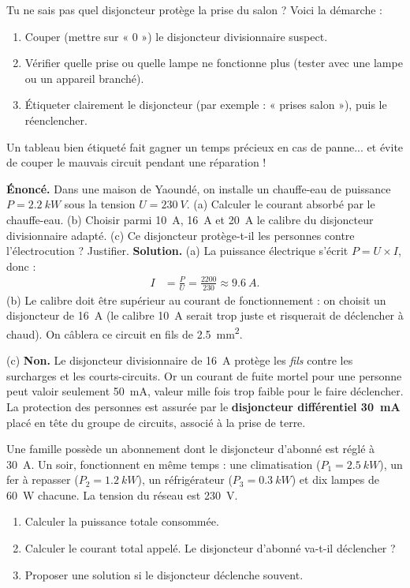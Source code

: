 \documentclass[11pt]{article}
\begin{document}
\begin{methode}
Tu ne sais pas quel disjoncteur protège la prise du salon ? Voici la démarche :
\begin{enumerate}
\item Couper (mettre sur « 0 ») le disjoncteur divisionnaire suspect.
\item Vérifier quelle prise ou quelle lampe ne fonctionne plus (tester avec une lampe ou un appareil branché).
\item Étiqueter clairement le disjoncteur (par exemple : « prises salon »), puis le réenclencher.
\end{enumerate}
Un tableau bien étiqueté fait gagner un temps précieux en cas de panne... et évite de couper le mauvais circuit pendant une réparation !
\end{methode}

\begin{exoresolu}
\textbf{Énoncé.} Dans une maison de Yaoundé, on installe un chauffe-eau de puissance $P = \SI{2,2}{kW}$ sous la tension $U = \SI{230}{V}$. (a) Calculer le courant absorbé par le chauffe-eau. (b) Choisir parmi \SI{10}{A}, \SI{16}{A} et \SI{20}{A} le calibre du disjoncteur divisionnaire adapté. (c) Ce disjoncteur protège-t-il les personnes contre l'électrocution ? Justifier.
\tcblower
\textbf{Solution.} (a) La puissance électrique s'écrit $P = U \times I$, donc :
\begin{align*}
I &= \frac{P}{U} = \frac{2200}{230} \approx \SI{9,6}{A}.
\end{align*}
(b) Le calibre doit être supérieur au courant de fonctionnement : on choisit un disjoncteur de \SI{16}{A} (le calibre \SI{10}{A} serait trop juste et risquerait de déclencher à chaud). On câblera ce circuit en fils de \SI{2,5}{mm^2}.

(c) \textbf{Non.} Le disjoncteur divisionnaire de \SI{16}{A} protège les \emph{fils} contre les surcharges et les courts-circuits. Or un courant de fuite mortel pour une personne peut valoir seulement \SI{50}{mA}, valeur mille fois trop faible pour le faire déclencher. La protection des personnes est assurée par le \textbf{disjoncteur différentiel \SI{30}{mA}} placé en tête du groupe de circuits, associé à la prise de terre.
\end{exoresolu}

\begin{exercice}
Une famille possède un abonnement dont le disjoncteur d'abonné est réglé à \SI{30}{A}. Un soir, fonctionnent en même temps : une climatisation ($P_1 = \SI{2,5}{kW}$), un fer à repasser ($P_2 = \SI{1,2}{kW}$), un réfrigérateur ($P_3 = \SI{0,3}{kW}$) et dix lampes de \SI{60}{W} chacune. La tension du réseau est \SI{230}{V}.
\begin{enumerate}
\item Calculer la puissance totale consommée.
\item Calculer le courant total appelé. Le disjoncteur d'abonné va-t-il déclencher ?
\item Proposer une solution si le disjoncteur déclenche souvent.
\end{enumerate}
\end{exercice}
\end{document}

